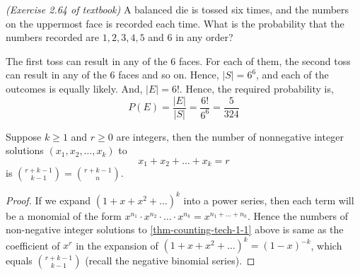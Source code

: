 \begin{example}
    \emph{(Exercise 2.64 of textbook)} A balanced die is tossed six times, and
the numbers on the uppermost face is recorded each time. What is the
probability that the numbers recorded are $1, 2, 3, 4, 5$ and $6$ in any order?
\end{example}
\begin{solution}
    The first toss can result in any of the $6$ faces. For each of them, the
second toss can result in any of the $6$ faces and so on. Hence, $\vert S
\vert = 6^6$, and each of the outcomes is equally likely. And, $\vert E \vert
= 6!$. Hence, the required probability is, 
\begin{equation*}
    P(E) = \frac{\vert E \vert}{\vert S \vert} 
         = \frac{6!}{6^6} 
         = \frac{5}{324}
\end{equation*}
\end{solution}

\begin{theorem}
    Suppose $k \geq 1$ and $r \geq 0$ are integers, then the number of
nonnegative integer solutions $(x_1, x_2, \dots, x_k)$ to
\begin{equation}
    \label{thm-counting-tech-1-1}
    x_1 + x_2 + \dots + x_k = r
\end{equation}
is ${{r + k - 1} \choose {k - 1}} = {{r + k - 1} \choose {n}}$.
\end{theorem}
\begin{proof}
    If we expand $(1 + x + x^2 + \dots)^k$ into a power series, then each term
will be a monomial of the form $x^{n_1} \cdot x^{n_2} \cdot \dots \cdot
x^{n_k} = x^{n_1 + \dots + n_k}$. Hence the numbers of non-negative integer
solutions to \ref{thm-counting-tech-1-1} above is same as the coefficient of
$x^r$ in the expansion of $(1 + x + x^2 + \dots)^k = (1 - x)^{-k}$, which
equals ${{r + k - 1} \choose {k - 1}}$ (recall the negative binomial series).
\end{proof}

